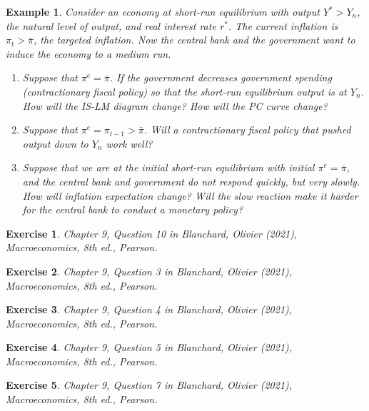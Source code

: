 \documentclass[12pt]{article}
\newtheorem{example}{Example}
\newtheorem{exercise}{Exercise}
\begin{document}
\begin{example}
  Consider an economy at short-run equilibrium with output $Y^*>Y_n$, the natural level of output, and real interest rate $r^*$. The current inflation is $\pi_t>\bar{\pi}$, the targeted inflation. Now the central bank and the government want to induce the economy to a medium run.
  \begin{enumerate}[label=(\arabic*)]
    \item Suppose that $\pi^e = \bar{\pi}$. If the government decreases government spending (contractionary fiscal policy) so that the short-run equilibrium output is at $Y_n$. How will the IS-LM diagram change? How will the PC curve change? 
    \vspace{80pt}
    \item Suppose that $\pi^e = \pi_{t-1} > \bar{\pi}$. Will a contractionary fiscal policy that pushed output down to $Y_n$ work well?
    \vspace{80pt}
    \item Suppose that we are at the initial short-run equilibrium with initial $\pi^e = \bar{\pi}$, and the central bank and government do not respond quickly, but very slowly. How will inflation expectation change? Will the slow reaction make it harder for the central bank to conduct a monetary policy?
    \vspace{80pt}
  \end{enumerate}
\end{example}

\begin{exercise}
  Chapter 9, Question 10 in Blanchard, Olivier (2021), \textit{Macroeconomics}, 8th ed., Pearson.
\end{exercise}

\begin{exercise}
  Chapter 9, Question 3 in Blanchard, Olivier (2021), \textit{Macroeconomics}, 8th ed., Pearson.
\end{exercise}

\begin{exercise}
  Chapter 9, Question 4 in Blanchard, Olivier (2021), \textit{Macroeconomics}, 8th ed., Pearson.
\end{exercise}

\begin{exercise}
  Chapter 9, Question 5 in Blanchard, Olivier (2021), \textit{Macroeconomics}, 8th ed., Pearson.
\end{exercise}

\begin{exercise}
  Chapter 9, Question 7 in Blanchard, Olivier (2021), \textit{Macroeconomics}, 8th ed., Pearson.
\end{exercise}
\end{document}
